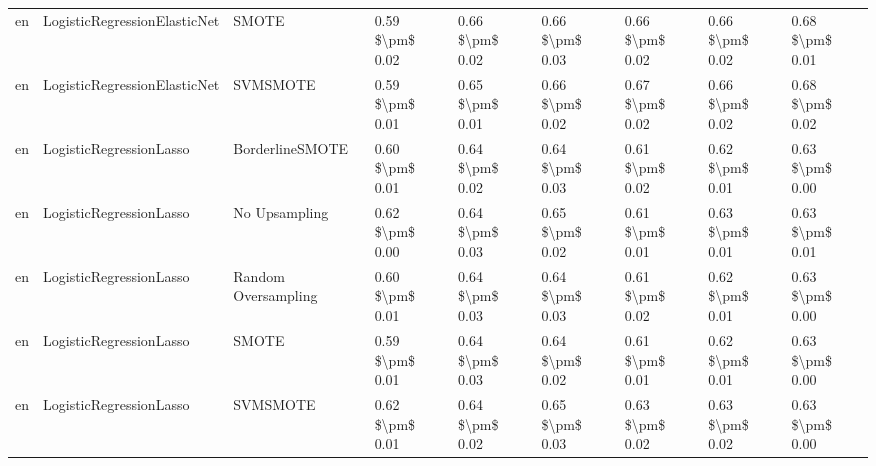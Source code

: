 \begin{tabular}{lllllllll}
      en &    LogisticRegressionElasticNet &                         SMOTE & 0.59 \$\textbackslash pm\$ 0.02 &           0.66 \$\textbackslash pm\$ 0.02 &       0.66 \$\textbackslash pm\$ 0.03 &        0.66 \$\textbackslash pm\$ 0.02 &                         0.66 \$\textbackslash pm\$ 0.02 &     0.68 \$\textbackslash pm\$ 0.01 \\
      en &    LogisticRegressionElasticNet &                      SVMSMOTE & 0.59 \$\textbackslash pm\$ 0.01 &           0.65 \$\textbackslash pm\$ 0.01 &       0.66 \$\textbackslash pm\$ 0.02 &        0.67 \$\textbackslash pm\$ 0.02 &                         0.66 \$\textbackslash pm\$ 0.02 &     0.68 \$\textbackslash pm\$ 0.02 \\
      en &         LogisticRegressionLasso &               BorderlineSMOTE & 0.60 \$\textbackslash pm\$ 0.01 &           0.64 \$\textbackslash pm\$ 0.02 &       0.64 \$\textbackslash pm\$ 0.03 &        0.61 \$\textbackslash pm\$ 0.02 &                         0.62 \$\textbackslash pm\$ 0.01 &     0.63 \$\textbackslash pm\$ 0.00 \\
      en &         LogisticRegressionLasso &                 No Upsampling & 0.62 \$\textbackslash pm\$ 0.00 &           0.64 \$\textbackslash pm\$ 0.03 &       0.65 \$\textbackslash pm\$ 0.02 &        0.61 \$\textbackslash pm\$ 0.01 &                         0.63 \$\textbackslash pm\$ 0.01 &     0.63 \$\textbackslash pm\$ 0.01 \\
      en &         LogisticRegressionLasso &           Random Oversampling & 0.60 \$\textbackslash pm\$ 0.01 &           0.64 \$\textbackslash pm\$ 0.03 &       0.64 \$\textbackslash pm\$ 0.03 &        0.61 \$\textbackslash pm\$ 0.02 &                         0.62 \$\textbackslash pm\$ 0.01 &     0.63 \$\textbackslash pm\$ 0.00 \\
      en &         LogisticRegressionLasso &                         SMOTE & 0.59 \$\textbackslash pm\$ 0.01 &           0.64 \$\textbackslash pm\$ 0.03 &       0.64 \$\textbackslash pm\$ 0.02 &        0.61 \$\textbackslash pm\$ 0.01 &                         0.62 \$\textbackslash pm\$ 0.01 &     0.63 \$\textbackslash pm\$ 0.00 \\
      en &         LogisticRegressionLasso &                      SVMSMOTE & 0.62 \$\textbackslash pm\$ 0.01 &           0.64 \$\textbackslash pm\$ 0.02 &       0.65 \$\textbackslash pm\$ 0.03 &        0.63 \$\textbackslash pm\$ 0.02 &                         0.63 \$\textbackslash pm\$ 0.02 &     0.63 \$\textbackslash pm\$ 0.00 \\

\end{tabular}

